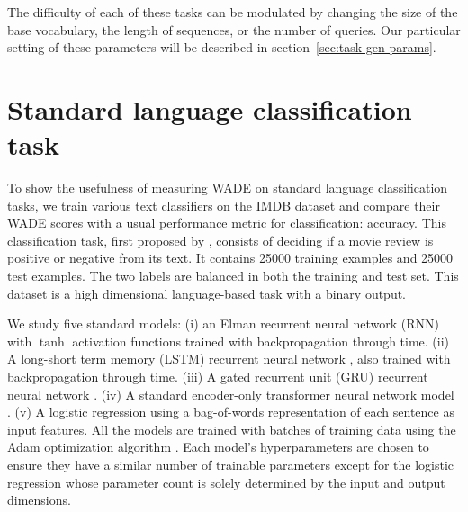 The difficulty of each of these tasks can be modulated by changing the size of the
base vocabulary, the length of sequences, or the number of queries. Our particular setting of these parameters will be described in section~\ref{sec:task-gen-params}.

\section{Standard language classification task}

To show the usefulness of measuring \ac{WADE} on standard language
classification tasks, we train various text classifiers on the IMDB dataset and
compare their \ac{WADE} scores with a usual performance metric for
classification: accuracy. This classification task, first proposed by
\cite{maassRealTimeComputingStable2002}, consists of deciding if a movie review
is positive or negative from its text. It contains 25000 training examples and
25000 test examples. The two labels are balanced in both the training and test
set. This dataset is a high dimensional language-based task with a binary
output.

We study five standard models: (i) an Elman recurrent neural network (RNN)
\cite{elmanFindingStructureTime1990} with $\tanh$ activation functions trained
with backpropagation through time. (ii) A long-short term memory (LSTM)
recurrent neural network \cite{hochreiterLongShortTermMemory1997}, also trained
with backpropagation through time. (iii) A gated recurrent unit (GRU) recurrent
neural network \cite{choPropertiesNeuralMachine2014}. (iv) A standard
encoder-only transformer neural network model \cite{vaswaniAttentionAllYou2017}.
(v) A logistic regression using a bag-of-words representation of each sentence
as input features. All the models are trained with batches of training data
using the Adam optimization algorithm \cite{kingmaAdamMethodStochastic2015}.
Each model's hyperparameters are chosen to ensure they have a similar number of
trainable parameters except for the logistic regression whose parameter count is
solely determined by the input and output dimensions.

